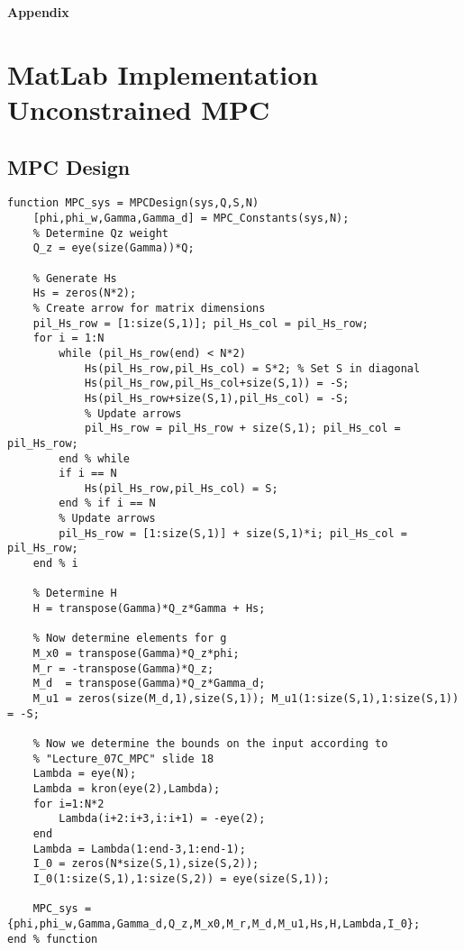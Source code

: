 \newpage
\begin{bilag}
\begin{appendices}

\begin{center}
\textbf{\huge{Appendix}}
\end{center}
\section{MatLab Implementation Unconstrained MPC}
\subsection{MPC Design}
\label{app:MPC_design}
\begin{lstlisting}[breaklines]
function MPC_sys = MPCDesign(sys,Q,S,N)
    [phi,phi_w,Gamma,Gamma_d] = MPC_Constants(sys,N);
    % Determine Qz weight
    Q_z = eye(size(Gamma))*Q;
    
    % Generate Hs
    Hs = zeros(N*2);
    % Create arrow for matrix dimensions
    pil_Hs_row = [1:size(S,1)]; pil_Hs_col = pil_Hs_row;
    for i = 1:N
        while (pil_Hs_row(end) < N*2)
            Hs(pil_Hs_row,pil_Hs_col) = S*2; % Set S in diagonal
            Hs(pil_Hs_row,pil_Hs_col+size(S,1)) = -S;
            Hs(pil_Hs_row+size(S,1),pil_Hs_col) = -S;
            % Update arrows
            pil_Hs_row = pil_Hs_row + size(S,1); pil_Hs_col = pil_Hs_row; 
        end % while
        if i == N
            Hs(pil_Hs_row,pil_Hs_col) = S;
        end % if i == N
        % Update arrows
        pil_Hs_row = [1:size(S,1)] + size(S,1)*i; pil_Hs_col = pil_Hs_row;
    end % i
    
    % Determine H
    H = transpose(Gamma)*Q_z*Gamma + Hs;
    
    % Now determine elements for g
    M_x0 = transpose(Gamma)*Q_z*phi;
    M_r = -transpose(Gamma)*Q_z;
    M_d  = transpose(Gamma)*Q_z*Gamma_d;
    M_u1 = zeros(size(M_d,1),size(S,1)); M_u1(1:size(S,1),1:size(S,1)) = -S;

    % Now we determine the bounds on the input according to
    % "Lecture_07C_MPC" slide 18
    Lambda = eye(N);
    Lambda = kron(eye(2),Lambda);
    for i=1:N*2
        Lambda(i+2:i+3,i:i+1) = -eye(2);
    end
    Lambda = Lambda(1:end-3,1:end-1);
    I_0 = zeros(N*size(S,1),size(S,2));
    I_0(1:size(S,1),1:size(S,2)) = eye(size(S,1));
    
    MPC_sys = {phi,phi_w,Gamma,Gamma_d,Q_z,M_x0,M_r,M_d,M_u1,Hs,H,Lambda,I_0};
end % function
\end{lstlisting}

\end{appendices}
\end{bilag}
